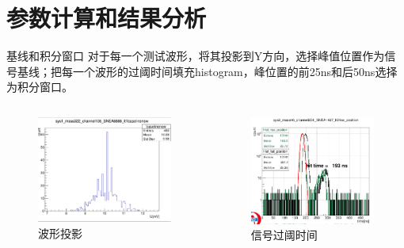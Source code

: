 \documentclass[11pt,compress,xcolor=x11names,UTF8]{beamer}
\begin{document}
\section{参数计算和结果分析}
\begin{frame}{基线和积分窗口}
对于每一个测试波形，将其投影到Y方向，选择峰值位置作为信号基线；把每一个波形的过阈时间填充histogram，峰位置的前25ns和后50ns选择为积分窗口。
\vspace{-.6cm}
\begin{columns}
\begin{column}{.5\textwidth}
\begin{figure}
\centering
\includegraphics[width=\textwidth]{figures/bsl.png} %
\caption{波形投影}
\end{figure}
\end{column}
\begin{column}{.5\textwidth}
\begin{figure}
\centering
\includegraphics[width=\textwidth]{figures/riseposition.png} %
\caption{信号过阈时间}
\end{figure}
\end{column}
\end{columns}
\end{frame}
\end{document}
